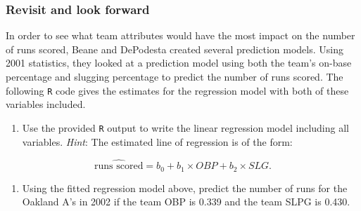 \documentclass[
]{report}
\newenvironment{Shaded}{\begin{snugshade}}{\end{snugshade}}
\newcommand{\AttributeTok}[1]{\textcolor[rgb]{0.77,0.63,0.00}{#1}}
\newcommand{\CommentTok}[1]{\textcolor[rgb]{0.56,0.35,0.01}{\textit{#1}}}
\newcommand{\DecValTok}[1]{\textcolor[rgb]{0.00,0.00,0.81}{#1}}
\newcommand{\FunctionTok}[1]{\textcolor[rgb]{0.00,0.00,0.00}{#1}}
\newcommand{\NormalTok}[1]{#1}
\newcommand{\OtherTok}[1]{\textcolor[rgb]{0.56,0.35,0.01}{#1}}
\newcommand{\SpecialCharTok}[1]{\textcolor[rgb]{0.00,0.00,0.00}{#1}}
\providecommand{\tightlist}{%
  \setlength{\itemsep}{0pt}\setlength{\parskip}{0pt}}
\begin{document}
\newpage

\hypertarget{revisit-and-look-forward-3}{%
\subsubsection*{Revisit and look forward}\label{revisit-and-look-forward-3}}

In order to see what team attributes would have the most impact on the number of runs scored, Beane and DePodesta created several prediction models. Using 2001 statistics, they looked at a prediction model using both the team's on-base percentage and slugging percentage to predict the number of runs scored. The following \texttt{R} code gives the estimates for the regression model with both of these variables included.

\begin{Shaded}
\end{Shaded}

\begin{enumerate}
\def\labelenumi{\arabic{enumi}.}
\setcounter{enumi}{20}
\tightlist
\item
  Use the provided \texttt{R} output to write the linear regression model including all variables. \emph{Hint}: The estimated line of regression is of the form:
\end{enumerate}

\[\widehat{\text{runs scored}} = b_0 + b_1\times OBP + b_2\times SLG.\]

\vspace{1in}

\begin{enumerate}
\def\labelenumi{\arabic{enumi}.}
\setcounter{enumi}{21}
\tightlist
\item
  Using the fitted regression model above, predict the number of runs for the Oakland A's in 2002 if the team OBP is 0.339 and the team SLPG is 0.430.
\end{enumerate}
\end{document}
